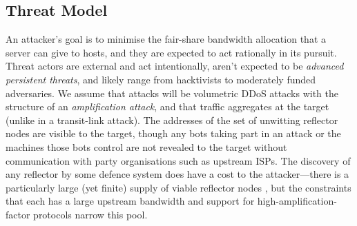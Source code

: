 \documentclass[10pt, times, comsoc]{IEEEtran}
\begin{document}
%

\subsection{Threat Model}
An attacker's goal is to minimise the fair-share bandwidth allocation that a server can give to hosts, and they are expected to act rationally in its pursuit.
Threat actors are external and act intentionally, aren't expected to be 
\emph{advanced persistent threats}, and likely range from hacktivists to moderately funded adversaries.
We assume that attacks will be volumetric DDoS attacks with the structure of an \emph{amplification attack}, and that traffic aggregates at the target (unlike in a transit-link attack).
The addresses of the set of unwitting reflector nodes are visible to the target, though any bots taking part in an attack or the machines those bots control are not revealed to the target without communication with  party organisations such as upstream ISPs.
The discovery of any reflector by some defence system does have a cost to the attacker---there is a particularly large (yet finite) supply of viable reflector nodes \cite{DBLP:conf/ndss/Rossow14}, but the constraints that each has a large upstream bandwidth and support for high-amplification-factor protocols narrow this pool.
\end{document}
